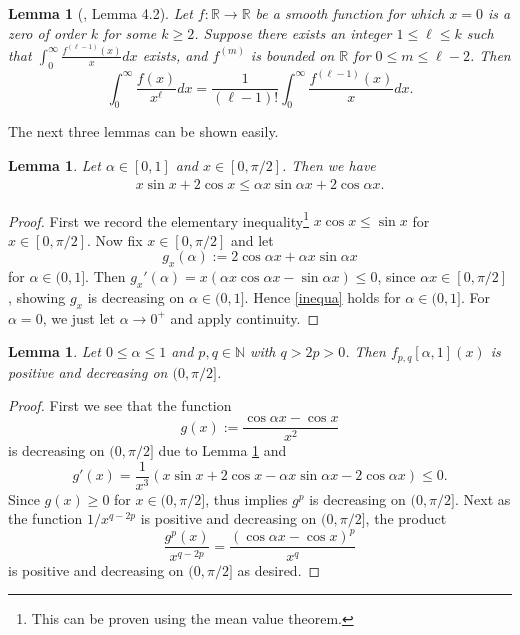 \documentclass[12pt, reqno]{amsart}
\theoremstyle{plain}
\newtheorem{lemma}[theorem]{Lemma}
\theoremstyle{definition}
\begin{document}
\begin{lemma}[\cite{AL}, Lemma 4.2]\label{l4}
		Let $f : \mathbb{R}\to\mathbb{R}$ be a smooth function for which $x=0$ is a zero of order $k$ for some $k\geq 2$. Suppose there exists an integer $1\le \ell\leq k$ such that $\int_0^\infty\frac{f^{(\ell-1)}(x)}{x}dx$ exists, and $f^{(m)}$ is bounded on $\mathbb{R}$ for $0 \leq m \leq \ell-2$. Then
		\[\int_0^\infty\frac{f(x)}{x^{\ell}}dx=\frac{1}{(\ell-1)!}\int_0^\infty\frac{f^{(\ell-1)}(x)}{x}dx.\]
\end{lemma}

The next three lemmas can be shown easily.


\begin{lemma}\label{basiclem}
    Let $\alpha\in[0, 1]$ and $x\in[0, \pi/2]$. Then we have
    \begin{align}\label{inequa}
        x\sin x+2\cos x\le \alpha x\sin\alpha x+2\cos\alpha x.
    \end{align}
\end{lemma}
\begin{proof}
First we record the elementary inequality\footnote{This can be proven using the mean value theorem.} $x\cos x\le\sin x$ for $x\in[0, \pi/2]$. Now fix $x\in[0, \pi/2]$ and let \[g_x(\alpha):=2\cos\alpha x+\alpha x\sin\alpha x\] for $\alpha\in(0, 1]$. Then
$g_x'(\alpha)=x(\alpha x\cos \alpha x-\sin\alpha x)\le 0$,
since $\alpha x\in[0, \pi/2]$, showing $g_x$ is decreasing on $\alpha\in(0, 1]$. Hence \eqref{inequa} holds for $\alpha\in(0, 1]$. For $\alpha=0$, we just let $\alpha\to 0^+$ and apply continuity.
\end{proof}


\begin{lemma}\label{lem.dec}  Let $0\le \alpha\le 1$ and $p, q\in\mathbb{N}$ with $q>2p>0$. Then $f_{p, q}[\alpha, 1](x)$ is positive and decreasing on $(0, \pi/2]$.\end{lemma}
\begin{proof}
    First we see that the function
    \[g(x):=\frac{\cos\alpha x-\cos x}{x^2}\]
    is decreasing on $(0, \pi/2]$ due to Lemma \ref{basiclem} and
    \[g'(x)=\frac{1}{x^3}(x\sin x+2\cos x-\alpha x\sin \alpha x-2\cos\alpha x)\le 0.\]
    Since $g(x)\ge 0$ for $x\in(0, \pi/2]$, thus implies $g^p$ is decreasing on $(0, \pi/2]$. Next as the function $1/x^{q-2p}$ is positive and decreasing on $(0, \pi/2]$, the product
    \[\frac{g^p(x)}{x^{q-2p}}=\frac{(\cos\alpha x-\cos x)^p}{x^q}\]
    is positive and decreasing on $(0, \pi/2]$ as desired.
\end{proof}
\end{document}
